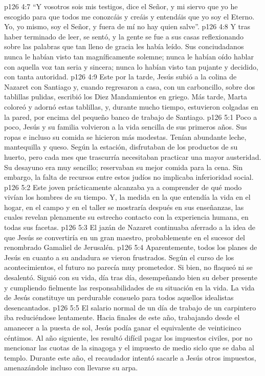 \vs p126 4:7 “Y vosotros sois mis testigos, dice el Señor, y mi siervo que yo he escogido para que todos me conozcáis y creáis y entendáis que yo soy el Eterno. Yo, yo mismo, soy el Señor, y fuera de mí no hay quien salve”.
\vs p126 4:8 \pc Y tras haber terminado de leer, se sentó, y la gente se fue a sus casas reflexionando sobre las palabras que tan lleno de gracia les había leído. Sus conciudadanos nunca le habían visto tan magníficamente solemne; nunca le habían oído hablar con aquella voz tan seria y sincera; nunca lo habían visto tan pujante y decidido, con tanta autoridad.
\vs p126 4:9 Este  por la tarde, Jesús subió a la colina de Nazaret con Santiago y, cuando regresaron a casa, con un carboncillo, sobre dos tablillas pulidas, escribió los Diez Mandamientos en griego. Más tarde, Marta coloreó y adornó estas tablillas, y, durante mucho tiempo, estuvieron colgadas en la pared, por encima del pequeño banco de trabajo de Santiago.
\vs p126 5:1 Poco a poco, Jesús y su familia volvieron a la vida sencilla de sus primeros años. Sus ropas e incluso su comida se hicieron más modestas. Tenían abundante leche, mantequilla y queso. Según la estación, disfrutaban de los productos de su huerto, pero cada mes que trascurría necesitaban practicar una mayor austeridad. Su desayuno era muy sencillo; reservaban su mejor comida para la cena. Sin embargo, la falta de recursos entre estos judíos no implicaba inferioridad social.
\vs p126 5:2 Este joven prácticamente alcanzaba ya a comprender de qué modo vivían los hombres de su tiempo. Y, la medida en la que entendía la vida en el hogar, en el campo y en el taller se mostraría después en sus enseñanzas, las cuales revelan plenamente su estrecho contacto con la experiencia humana, en todas sus facetas.
\vs p126 5:3 El jazán de Nazaret continuaba aferrado a la idea de que Jesús se convertiría en un gran maestro, probablemente en el sucesor del renombrado Gamaliel de Jerusalén.
\vs p126 5:4 \pc Aparentemente, todos los planes de Jesús en cuanto a su andadura se vieron frustrados. Según el curso de los acontecimientos, el futuro no parecía muy prometedor. Si bien, no flaqueó ni se desalentó. Siguió con su vida, día tras día, desempeñando bien su deber presente y cumpliendo fielmente las responsabilidades  de su situación en la vida. La vida de Jesús constituye un perdurable consuelo para todos aquellos idealistas desencantados.
\vs p126 5:5 El salario normal de un día de trabajo de un carpintero iba reduciéndose lentamente. Hacia finales de este año, trabajando desde el amanecer a la puesta de sol, Jesús podía ganar el equivalente de veinticinco céntimos. Al año siguiente, les resultó difícil pagar los impuestos civiles, por no mencionar las cuotas de la sinagoga y el impuesto de medio siclo que se daba al templo. Durante este año, el recaudador intentó sacarle a Jesús otros impuestos, amenazándole incluso con llevarse su arpa.
